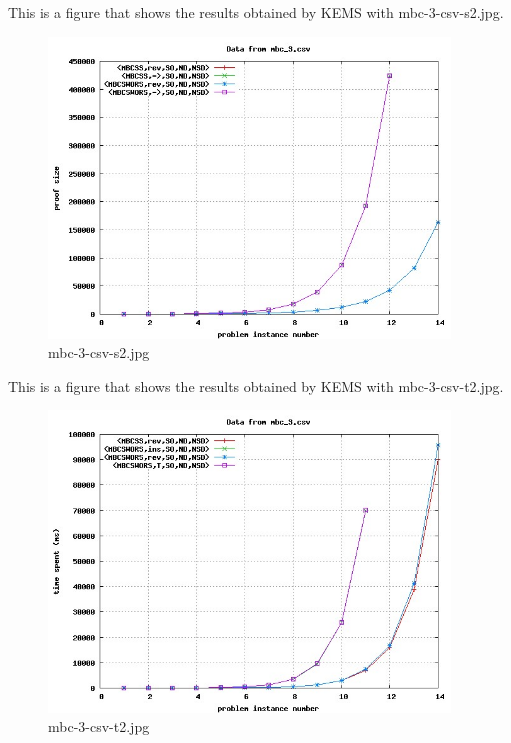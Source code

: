 This is a figure that shows the results obtained by KEMS with mbc-3-csv-s2.jpg.
\begin{figure}[htbp]
\begin{center}
\includegraphics[width=0.95\textwidth]{figuras/mbc-3-csv-s2.jpg}
\end{center}
\caption{mbc-3-csv-s2.jpg}
\end{figure}

This is a figure that shows the results obtained by KEMS with mbc-3-csv-t2.jpg.
\begin{figure}[htbp]
\begin{center}
\includegraphics[width=0.95\textwidth]{figuras/mbc-3-csv-t2.jpg}
\end{center}
\caption{mbc-3-csv-t2.jpg}
\end{figure}

